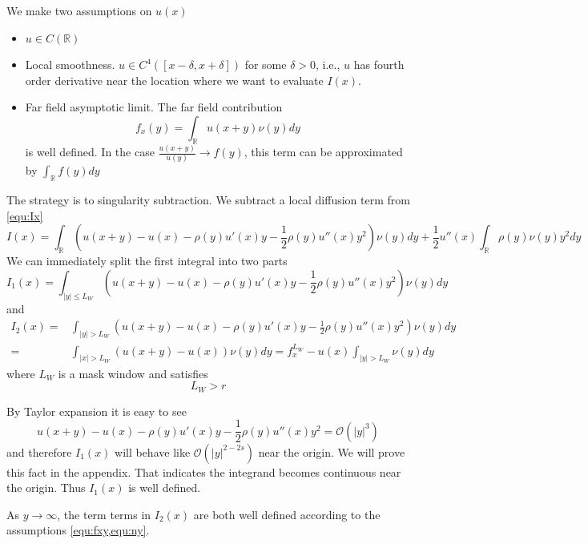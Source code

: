 \documentclass[10pt,a4paper]{article}
\newcommand{\RR}[0]{\mathbb{R}}
\theoremstyle{definition}
\begin{document}
We make two assumptions on $u(x)$
\begin{itemize}
	\item $u\in C(\RR)$ 
	\item Local smoothness. $u\in C^4([x-\delta, x+\delta])$ for some $\delta>0$, i.e., $u$ has fourth order derivative near the location where we want to evaluate $I(x)$.
	\item Far field asymptotic limit. The far field contribution
	\begin{equation}\label{equ:fxy}
		f_x(y) = \int_{\RR}u(x+y)\nu(y)dy
	\end{equation}
	is well defined. In the case $\frac{u(x+y)}{u(y)}\rightarrow f(y)$, this term can be approximated by $\int_\RR f(y)dy$
\end{itemize}

The strategy is to singularity subtraction. We subtract a local diffusion term from \cref{equ:Ix}
\begin{equation}\label{equ:evalIx1d}
	I(x) = \int_{\RR}(u(x+y)-u(x)-\rho(y)u'(x)y- \frac{1}{2}\rho(y)u''(x)y^2 )\nu(y)dy + \frac{1}{2}u''(x)\int_\RR \rho(y)\nu(y)y^2 dy
\end{equation}
We can immediately split the first integral into two parts
\begin{equation}
	I_1(x) = \int_{|y|\leq L_W}(u(x+y)-u(x)-\rho(y)u'(x)y- \frac{1}{2}\rho(y)u''(x)y^2 )\nu(y)dy
\end{equation}
and
\begin{align}
	I_2(x) =& \int_{|y|> L_W}(u(x+y)-u(x)-\rho(y)u'(x)y- \frac{1}{2}\rho(y)u''(x)y^2 )\nu(y)dy\\
	 = &\int_{|x|> L_W}(u(x+y)-u(x) )\nu(y)dy = f_x^{L_W} - u(x)\int_{|y|> L_W}\nu(y)dy
\end{align}
where $L_W$ is a mask window and satisfies
\begin{equation}
	L_W > r
\end{equation}

By Taylor expansion it is easy to see
\begin{equation}
	u(x+y)-u(x)-\rho(y)u'(x)y- \frac{1}{2}\rho(y)u''(x)y^2 =\mathcal{O}(|y|^3)
\end{equation}
and therefore $I_1(x)$ will behave like $\mathcal{O}(|y|^{2-2s})$ near the origin. We will prove this fact in the appendix. That indicates the integrand becomes continuous near the origin. Thus $I_1(x)$ is well defined.   

As $y\rightarrow \infty$, the term terms in $I_2(x)$ are both well defined according to the assumptions \cref{equ:fxy,equ:ny}. 
\end{document}
